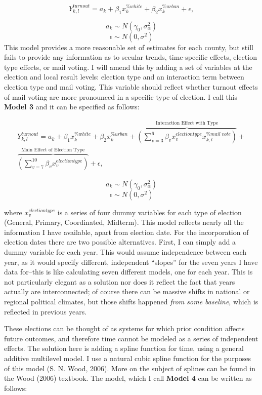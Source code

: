 \documentclass[12pt,twoside]{reedthesis}
\begin{document}
  \begin{equation} \tag{Model 2}
  Y^{turnout}_{k,l} = a_{k} + \beta_{1}x_k^{\%white} + \beta_{2}x_k^{\%urban} + \epsilon,
  \end{equation}
  
  \[a_{k} \sim N (\gamma_0, \sigma_{\alpha}^2)\]
  \[\epsilon \sim N(0, \sigma^2)\] This model provides a more reasonable
  set of estimates for each county, but still fails to provide any
  information as to secular trends, time-specific effects, election type
  effects, or mail voting. I will amend this by adding a set of variables
  at the election and local result levels: election type and an
  interaction term between election type and mail voting. This variable
  should reflect whether turnout effects of mail voting are more
  pronounced in a specific type of election. I call this \textbf{Model 3}
  and it can be specified as follows:
  
  \begin{multline} \tag{Model 3}
  Y^{turnout}_{k,l} = a_{k} + \beta_{1}x_k^{\% white} + \beta_{2}x_k^{\% urban} + \overbrace{(\sum_{v=3}^{6}\beta_{v}x_{v}^{election type} x_{k,l}^{\% mail~vote})}^\text{Interaction Effect with Type} + \\ \overbrace{(\sum_{v=7}^{10}\beta_{v}x_{v}^{election type})}^\text{Main Effect of Election Type} + \epsilon,
  \end{multline}
  
  \[a_{k} \sim N(\gamma_0, \sigma_{\alpha}^2)\]
  \[\epsilon \sim N(0, \sigma^2)\]
  
  where \(x_{v}^{election type}\) is a series of four dummy variables for
  each type of election (General, Primary, Coordinated, Midterm). This
  model reflects nearly all the information I have available, apart from
  election date. For the incorporation of election dates there are two
  possible alternatives. First, I can simply add a dummy variable for each
  year. This would assume independence between each year, as it would
  specify different, independent ``slopes'' for the seven years I have
  data for--this is like calculating seven different models, one for each
  year. This is not particularly elegant as a solution nor does it reflect
  the fact that years actually are interconnected; of course there can be
  massive shifts in national or regional political climates, but those
  shifts happened \emph{from some baseline}, which is reflected in
  previous years.
  
  These elections can be thought of as systems for which prior condition
  affects future outcomes, and therefore time cannot be modeled as a
  series of independent effects. The solution here is adding a spline
  function for time, using a general additive multilevel model. I use a
  natural cubic spline function for the purposes of this model (S. N.
  Wood, 2006). More on the subject of splines can be found in the Wood
  (2006) textbook. The model, which I call \textbf{Model 4} can be written
  as follows:
  
\end{document}
